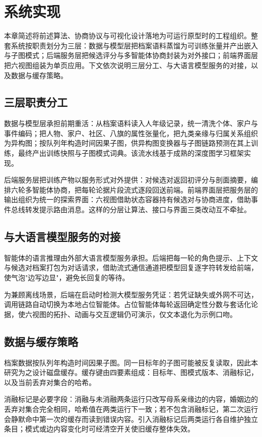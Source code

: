 \chapter{系统实现}\label{chap:impl}

本章简述将前述算法、协商协议与可视化设计落地为可运行原型时的工程组织。整套系统按职责划分为三层：数据与模型层把档案语料蒸馏为可训练张量并产出嵌入与子图模式；后端服务层把候选评分与多智能体协商封装为对外接口；前端界面层把六视图组装为单页应用。下文依次说明三层分工、与大语言模型服务的对接，以及数据与缓存策略。

\section{三层职责分工}\label{sec:impl-arch}

数据与模型层承担前期重活：从档案语料读入人年级记录，统一清洗个体、家户与事件编码；把人物、家户、社区、八旗的属性张量化，把九类亲缘与归属关系组织为异构图；按队列年构造时间因果子图，供异构图变换器与子图链路预测在其上训练，最终产出训练快照与子图模式词典。该流水线基于成熟的深度图学习框架实现\citep{paszke2019pytorch,fey2019pyg}。

后端服务层把训练产物以服务形式对外提供：对候选对返回初评分与剖面摘要，编排六轮多智能体协商，把每轮论据片段流式逐段回送前端。前端界面层把服务层的输出组织为统一的探索界面：六视图借助状态容器持有候选对与协商进度，借助事件总线转发提示路由消息。这样的分层让算法、接口与界面三类改动互不牵扯。

\section{与大语言模型服务的对接}\label{sec:impl-llm}

智能体的语言推理由外部大语言模型服务承担。后端把每一轮的角色提示、上下文与候选对档案打包为对话请求，借助流式通信通道把模型回复逐字符转发给前端，使气泡"边写边显"，避免长回复的等待。

为兼顾离线场景，后端在启动时检测大模型服务凭证：若凭证缺失或外网不可达，调用链路自动切换为本地占位智能体。占位智能体每轮返回确定性分数与套话化论据，使六视图的拓扑、动画与交互逻辑仍可演示，仅文本退化为示例口吻。

\section{数据与缓存策略}\label{sec:impl-cache}

档案数据按队列年构造时间因果子图。同一目标年的子图可能被反复读取，因此本研究为之设计磁盘缓存。缓存键由四要素组成：目标年、图模式版本、消融标记，以及当前丢弃对集合的哈希。

消融标记是必要字段：消融与未消融两条运行只改写母系亲缘边的内容，婚姻边的丢弃对集合完全相同，哈希值在两类运行下一致；若不包含消融标记，第二次运行会静默命中第一次的缓存而读到错误内容。引入消融标记后两类运行各自维护独立条目；模式或边内容变化时可经清空开关使旧缓存整体失效。